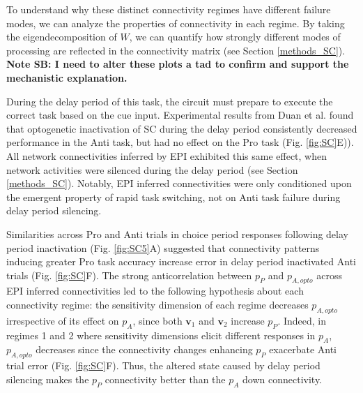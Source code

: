 \documentclass[11pt]{article}
\begin{document}
To understand why these distinct connectivity regimes have different failure modes, we can analyze the properties of connectivity in each regime.
By taking the eigendecomposition of $W$, we can quantify how strongly different modes of processing are reflected in the connectivity matrix (see Section \ref{methods_SC}).  
\textbf{Note SB: I need to alter these plots a tad to confirm and support the mechanistic explanation.}

During the delay period of this task, the circuit must prepare to execute the correct task based on the cue input.
Experimental results from Duan et al. found that optogenetic inactivation of SC during the delay period consistently decreased performance in the Anti task, but had no effect on the Pro task (Fig. \ref{fig:SC}E)).
All network connectivities inferred by EPI exhibited this same effect, when network activities were silenced during the delay period (see Section \ref{methods_SC}).
Notably, EPI inferred connectivities were only conditioned upon the emergent property of rapid task switching, not on Anti task failure during delay period silencing.

Similarities across Pro and Anti trials in choice period responses following delay period inactivation (Fig. \ref{fig:SC5}A) suggested that connectivity patterns inducing greater Pro task accuracy increase error in delay period inactivated Anti trials (Fig. \ref{fig:SC}F).
The strong anticorrelation between $p_P$ and $p_{A, opto}$ across EPI inferred connectivities led to the following hypothesis about each connectivity regime: the sensitivity dimension of each regime decreases $p_{A,opto}$ irrespective of its effect on $p_A$, since both $\mathbf{v}_1$ and $\mathbf{v}_2$ increase $p_P$.
Indeed, in regimes 1 and 2 where sensitivity dimensions elicit different responses in $p_A$, $p_{A,opto}$ decreases since the connectivity changes enhancing $p_P$ exacerbate Anti trial error (Fig. \ref{fig:SC}F).
Thus, the altered state caused by delay period silencing makes the $p_P$ connectivity better than the $p_A$ down connectivity.
\end{document}
